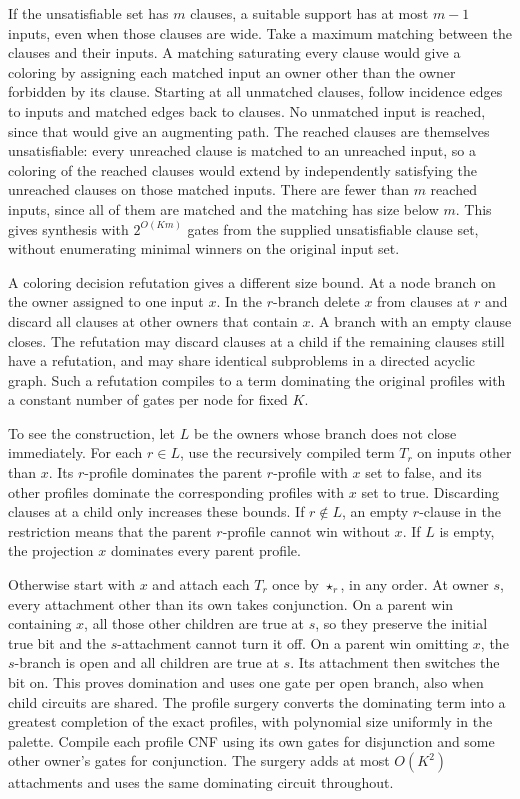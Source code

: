 If the unsatisfiable set has $m$ clauses, a suitable
support has at most $m-1$ inputs, even when those clauses
are wide. Take a maximum matching between the clauses
and their inputs. A matching saturating every clause
would give a coloring by assigning each matched input
an owner other than the owner forbidden by its clause.
Starting at all unmatched clauses, follow incidence
edges to inputs and matched edges back to clauses.
No unmatched input is reached, since that would give
an augmenting path. The reached clauses are themselves
unsatisfiable: every unreached clause is matched to
an unreached input, so a coloring of the reached
clauses would extend by independently satisfying
the unreached clauses on those matched inputs.
There are fewer than $m$ reached inputs, since all of
them are matched and the matching has size below $m$.
This gives synthesis with $2^{O(Km)}$ gates from the
supplied unsatisfiable clause set, without enumerating
minimal winners on the original input set.

A coloring decision refutation gives a different size
bound. At a node branch on the owner assigned to one
input $x$. In the $r$-branch delete $x$ from clauses
at $r$ and discard all clauses at other owners that
contain $x$. A branch with an empty clause closes.
The refutation may discard clauses at a child if the
remaining clauses still have a refutation, and may
share identical subproblems in a directed acyclic
graph. Such a refutation compiles to a term dominating
the original profiles with a constant number of
gates per node for fixed $K$.

To see the construction, let $L$ be the owners
whose branch does not close immediately. For each
$r\in L$, use the recursively compiled term $T_r$
on inputs other than $x$. Its $r$-profile dominates
the parent $r$-profile with $x$ set to false, and
its other profiles dominate the corresponding
profiles with $x$ set to true. Discarding clauses
at a child only increases these bounds. If
$r\notin L$, an empty $r$-clause in the restriction
means that the parent $r$-profile cannot win without
$x$. If $L$ is empty, the projection $x$ dominates
every parent profile.

Otherwise start with $x$ and attach each $T_r$ once
by $\star_r$, in any order. At owner $s$, every
attachment other than its own takes conjunction.
On a parent win containing $x$, all those other
children are true at $s$, so they preserve the
initial true bit and the $s$-attachment cannot
turn it off. On a parent win omitting $x$, the
$s$-branch is open and all children are true at
$s$. Its attachment then switches the bit on.
This proves domination and uses one gate per
open branch, also when child circuits are shared.
The profile surgery converts the dominating
term into a greatest completion of the exact
profiles, with polynomial size uniformly in the
palette. Compile each profile CNF using its own
gates for disjunction and some other owner's
gates for conjunction. The surgery adds at most
$O(K^2)$ attachments and uses the same dominating
circuit throughout.

